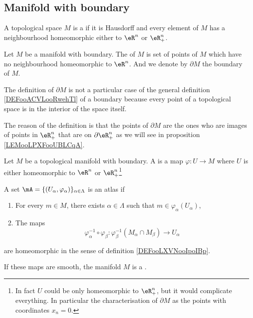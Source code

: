 \subsection{Manifold with boundary}

\begin{definition}	\label{DEFooNETXooZaZMcm}
	A topological space \( M\) is a  if it is Hausdorff and every element of \( M\) has a neighbourhood homeomorphic either to \( \eR^n\) or \( \eR^{n}_+\).

	Let \( M\) be a manifold with boundary. The  of \( M\) is set of points of \( M\) which have no neighbourhood homeomorphic to \( \eR^n\). And we denote by \( \partial M\) the boundary of \( M\).
\end{definition}

\begin{normaltext}
	The definition of \( \partial M\) is not a particular case of the general definition \ref{DEFooACVLooRwehTl} of a boundary because every point of a topological space is in the interior of the space itself.

	The reason of the definition is that the points of \( \partial M\) are the ones who are images of points in \( \eR^n_+\) that are on \( \partial \eR^n_+\) as we will see in proposition \ref{LEMooLPXFooUBLCqA}.
\end{normaltext}


\begin{theorem}	\label{THOooKKBLooIrITBe}
	Let \( M\) be a topological manifold with boundary. A  is a map \(\varphi \colon U\to M  \) where \( U\) is either homeomorphic to \( \eR^n\) or \( \eR^n_+\)\footnote{In fact \( U\) could be only homeomorphic to \( \eR^n_+\), but it would complicate everything. In particular the characterisation of \( \partial M\) as the points with coordinates \( x_n=0\).}

	A set \( \mA=\{ (U_{\alpha},\varphi_{\alpha}) \}_{\alpha\in \Lambda}\) is an atlas if
	\begin{enumerate}
		\item
		      For every \( m\in M\), there exists \( \alpha\in \Lambda\) such that \( m\in \varphi_{\alpha}(U_{\alpha})\),
		\item
		      The maps
		      \begin{equation}
			      \varphi_{\alpha}^{-1}\circ\varphi_{\beta} \colon \varphi_{\beta}^{-1}(M_{\alpha}\cap M_{\beta})\to U_{\alpha}
		      \end{equation}
	\end{enumerate}
	are homeomorphic in the sense of definition \ref{DEFooLXVNooIpoIBp}.

	If these maps are smooth, the manifold \( M\) is a .
\end{theorem}


